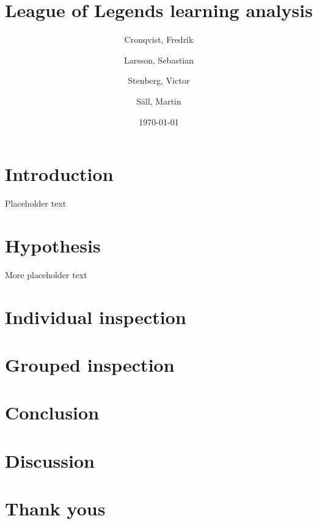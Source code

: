 \documentclass{article}
\author{Cronqvist, Fredrik \and Larsson, Sebastian \and Stenberg, Victor \and S\"{a}ll, Martin}
\date{\today}
\title{League of Legends learning analysis}
\begin{document}
\maketitle

\section{Introduction}
Placeholder text

\section{Hypothesis}
More placeholder text

\section{Individual inspection}

\section{Grouped inspection}

\section{Conclusion}

\section{Discussion}

\section{Thank yous}
\end{document}
